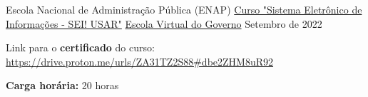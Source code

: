 \begin{cventries}
  \cventry
    {Escola Nacional de Administração Pública (ENAP)} %
    {\href{https://www.escolavirtual.gov.br/curso/74}{Curso "Sistema Eletrônico de Informações - SEI! USAR"}} %
    {\href{https://www.escolavirtual.gov.br/}{Escola Virtual do Governo}} %
    {Setembro de 2022} %
    {
      \begin{cvitems} %
        \item {Link para o \textbf{certificado} do curso: \url{https://drive.proton.me/urls/ZA31TZ2S88#dbe2ZHM8uR92}}
        \item {\textbf{Carga horária:} 20 horas}
      \end{cvitems}
    }

\end{cventries}
